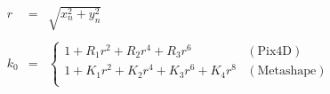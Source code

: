 \begin{equation}
  \begin{array}{llll}
    r   & = & \sqrt{x_n^2 + y_n^2} & \\ \\
    k_0 & = & 
      \begin{cases}
        1 + R_1 r^2 + R_2 r^4 + R_3 r^6           & (\text{Pix4D}) \\
        1 + K_1 r^2 + K_2 r^4 + K_3 r^6 + K_4 r^8 & (\text{Metashape})\\
      \end{cases}
  \end{array}
\label{eq:idp9}
\end{equation}